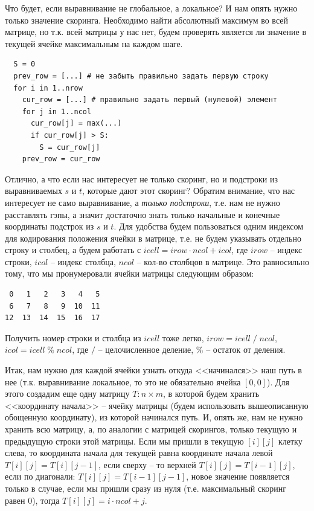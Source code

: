 \documentclass[letterpaper, 11pt]{article}
\begin{document}
Что будет, если выравнивание не глобальное, а локальное? И нам опять нужно только значение скоринга. Необходимо найти абсолютный максимум во всей матрице, но т.к. всей матрицы у нас нет, будем проверять является ли значение в текущей ячейке максимальным на каждом шаге.

\begin{verbatim}
  S = 0
  prev_row = [...] # не забыть правильно задать первую строку
  for i in 1..nrow
    cur_row = [...] # правильно задать первый (нулевой) элемент
    for j in 1..ncol
      cur_row[j] = max(...)
      if cur_row[j] > S:
        S = cur_row[j]
    prev_row = cur_row
\end{verbatim}

Отлично, а что если нас интересует не только скоринг, но и подстроки из выравниваемых $s$ и $t$, которые дают этот скоринг? Обратим внимание, что нас интересует не само выравнивание, а \textit{только подстроки}, т.е. нам не нужно расставлять гэпы, а значит достаточно знать только начальные и конечные координаты подстрок из $s$ и $t$. Для удобства будем пользоваться одним индексом для кодирования положения ячейки в матрице, т.е. не будем указывать отдельно строку и столбец, а будем работать с $icell = irow \cdot ncol + icol$, где $irow$ -- индекс строки, $icol$ -- индекс столбца, $ncol$ -- кол-во столбцов в матрице. Это равносильно тому, что мы пронумеровали ячейки матрицы следующим образом:

\begin{verbatim}
 0   1   2   3   4   5
 6   7   8   9  10  11
12  13  14  15  16  17
\end{verbatim}

Получить номер строки и столбца из $icell$ тоже легко, $irow = icell \; / \; ncol$, $icol = icell \; \% \; ncol$, где $/$ -- целочисленное деление, $\%$ -- остаток от деления.

Итак, нам нужно для каждой ячейки узнать откуда <<начинался>> наш путь в нее (т.к. выравнивание локальное, то это не обязательно ячейка $[0, 0]$). Для этого создадим еще одну матрицу $T : n \times m$, в которой будем хранить <<координату начала>> -- ячейку матрицы (будем использовать вышеописанную обощенную координату), из которой начинался путь. И, опять же, нам не нужно хранить всю матрицу, а, по аналогии с матрицей скорингов, только текущую и предыдущую строки этой матрицы. Если мы пришли в текущую $[i][j]$ клетку слева, то координата начала для текущей равна координате начала левой $T[i][j] = T[i][j - 1]$, если сверху -- то верхней $T[i][j] = T[i - 1][j]$, если по диагонали: $T[i][j] = T[i - 1][j - 1]$, новое значение появляется только в случае, если мы пришли сразу из нуля (т.е. максимальный скоринг равен $0$), тогда $T[i][j] = i \cdot ncol + j$.
\end{document}
